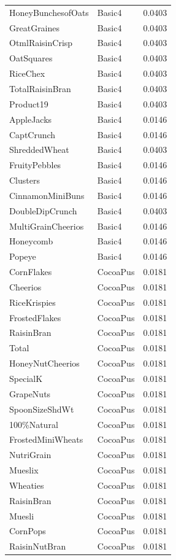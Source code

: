 \begin{longtable}{llr}
HoneyBunchesofOats & Basic4 & 0.0403 \\
GreatGraines & Basic4 & 0.0403 \\
OtmlRaisinCrisp & Basic4 & 0.0403 \\
OatSquares & Basic4 & 0.0403 \\
RiceChex & Basic4 & 0.0403 \\
TotalRaisinBran & Basic4 & 0.0403 \\
Product19 & Basic4 & 0.0403 \\
AppleJacks & Basic4 & 0.0146 \\
CaptCrunch & Basic4 & 0.0146 \\
ShreddedWheat & Basic4 & 0.0403 \\
FruityPebbles & Basic4 & 0.0146 \\
Clusters & Basic4 & 0.0146 \\
CinnamonMiniBuns & Basic4 & 0.0146 \\
DoubleDipCrunch & Basic4 & 0.0403 \\
MultiGrainCheerios & Basic4 & 0.0146 \\
Honeycomb & Basic4 & 0.0146 \\
Popeye & Basic4 & 0.0146 \\
CornFlakes & CocoaPus & 0.0181 \\
Cheerios & CocoaPus & 0.0181 \\
RiceKrispies & CocoaPus & 0.0181 \\
FrostedFlakes & CocoaPus & 0.0181 \\
RaisinBran & CocoaPus & 0.0181 \\
Total & CocoaPus & 0.0181 \\
HoneyNutCheerios & CocoaPus & 0.0181 \\
SpecialK & CocoaPus & 0.0181 \\
GrapeNuts & CocoaPus & 0.0181 \\
SpoonSizeShdWt & CocoaPus & 0.0181 \\
100\%Natural & CocoaPus & 0.0181 \\
FrostedMiniWheats & CocoaPus & 0.0181 \\
NutriGrain & CocoaPus & 0.0181 \\
Mueslix & CocoaPus & 0.0181 \\
Wheaties & CocoaPus & 0.0181 \\
RaisinBran & CocoaPus & 0.0181 \\
Muesli & CocoaPus & 0.0181 \\
CornPops & CocoaPus & 0.0181 \\
RaisinNutBran & CocoaPus & 0.0181 \\

\end{longtable}
